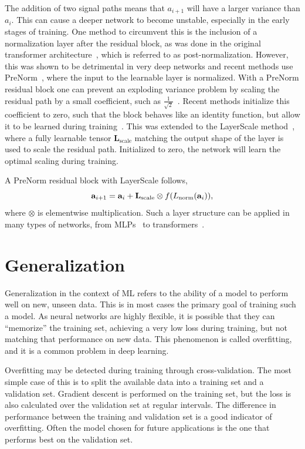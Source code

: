 The addition of two signal paths means that $a_{i+1}$ will have a larger variance than $a_i$.
This can cause a deeper network to become unstable, especially in the early stages of training.
One method to circumvent this is the inclusion of a normalization layer after the residual block, as was done in the original transformer architecture~\cite{Attention}, which is referred to as post-normalization.
However, this was shown to be detrimental in very deep networks and recent methods use \Gls{PreNorm}~\cite{PreLN}, where the input to the learnable layer is normalized.
With a \Gls{PreNorm} residual block one can prevent an exploding variance problem by scaling the residual path by a small coefficient, such as $\frac{1}{\sqrt{2}}$~\cite{StyleGAN2}.
Recent methods initialize this coefficient to zero, such that the block behaves like an identity function, but allow it to be learned during training~\cite{ReZero, SkipInit, Fixup}.
This was extended to the LayerScale method~\cite{GoingDeeper}, where a fully learnable tensor $\mathbf{L}_\text{scale}$ matching the output shape of the layer is used to scale the residual path.
Initialized to zero, the network will learn the optimal scaling during training.

A \Gls{PreNorm} residual block with LayerScale follows,
\begin{equation}
    \mathbf{a}_{i+1} = \mathbf{a}_i + \mathbf{L}_\text{scale} \otimes f( L_{\text{norm}}(\mathbf{a}_i) ),
\end{equation}
where $\otimes$ is elementwise multiplication.
Such a layer structure can be applied in many types of networks, from MLPs~\cite{InvertedBottleneck} to transformers~\cite{GoingDeeper}.

\section{Generalization}

Generalization in the context of \Gls{ML} refers to the ability of a model to perform well on new, unseen data.
This is in most cases the primary goal of training such a model.
As neural networks are highly flexible, it is possible that they can ``memorize'' the training set, achieving a very low loss during training, but not matching that performance on new data.
This phenomenon is called overfitting, and it is a common problem in deep learning.

Overfitting may be detected during training through cross-validation.
The most simple case of this is to split the available data into a training set and a validation set.
Gradient descent is performed on the training set, but the loss is also calculated over the validation set at regular intervals.
The difference in performance between the training and validation set is a good indicator of overfitting.
Often the model chosen for future applications is the one that performs best on the validation set.

